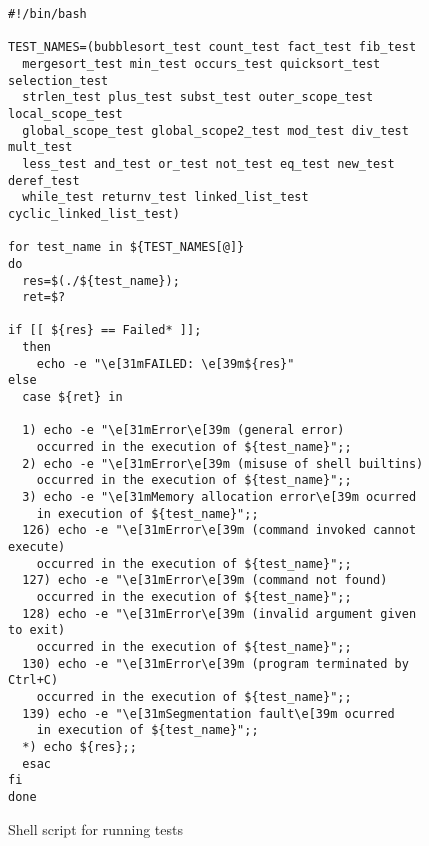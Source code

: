 \begin{figure}
\begin{lstlisting}
#!/bin/bash

TEST_NAMES=(bubblesort_test count_test fact_test fib_test
  mergesort_test min_test occurs_test quicksort_test selection_test
  strlen_test plus_test subst_test outer_scope_test local_scope_test
  global_scope_test global_scope2_test mod_test div_test mult_test
  less_test and_test or_test not_test eq_test new_test deref_test
  while_test returnv_test linked_list_test cyclic_linked_list_test)

for test_name in ${TEST_NAMES[@]}
do
  res=$(./${test_name});
  ret=$?

if [[ ${res} == Failed* ]];
  then
    echo -e "\e[31mFAILED: \e[39m${res}"
else
  case ${ret} in

  1) echo -e "\e[31mError\e[39m (general error)
    occurred in the execution of ${test_name}";;
  2) echo -e "\e[31mError\e[39m (misuse of shell builtins)
    occurred in the execution of ${test_name}";;
  3) echo -e "\e[31mMemory allocation error\e[39m ocurred
    in execution of ${test_name}";;
  126) echo -e "\e[31mError\e[39m (command invoked cannot execute)
    occurred in the execution of ${test_name}";;
  127) echo -e "\e[31mError\e[39m (command not found)
    occurred in the execution of ${test_name}";;
  128) echo -e "\e[31mError\e[39m (invalid argument given to exit)
    occurred in the execution of ${test_name}";;
  130) echo -e "\e[31mError\e[39m (program terminated by Ctrl+C)
    occurred in the execution of ${test_name}";;
  139) echo -e "\e[31mSegmentation fault\e[39m ocurred
    in execution of ${test_name}";;
  *) echo ${res};;
  esac
fi
done
\end{lstlisting}

\caption{Shell script for running tests}
\label{fig:bash_script}
\end{figure}
